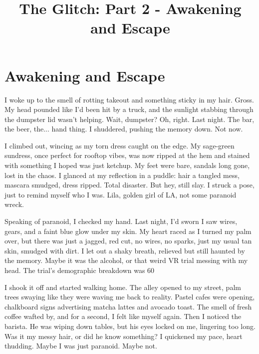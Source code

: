 \documentclass{article}
\title{The Glitch: Part 2 - Awakening and Escape}
\author{}
\date{}
\begin{document}
\maketitle

\section{Awakening and Escape}

I woke up to the smell of rotting takeout and something sticky in my hair. Gross. My head pounded like I'd been hit by a truck, and the sunlight stabbing through the dumpster lid wasn't helping. Wait, dumpster? Oh, right. Last night. The bar, the beer, the... hand thing. I shuddered, pushing the memory down. Not now.

I climbed out, wincing as my torn dress caught on the edge. My sage-green sundress, once perfect for rooftop vibes, was now ripped at the hem and stained with something I hoped was just ketchup. My feet were bare, sandals long gone, lost in the chaos. I glanced at my reflection in a puddle: hair a tangled mess, mascara smudged, dress ripped. Total disaster. But hey, still slay. I struck a pose, just to remind myself who I was. Lila, golden girl of LA, not some paranoid wreck.

Speaking of paranoid, I checked my hand. Last night, I'd sworn I saw wires, gears, and a faint blue glow under my skin. My heart raced as I turned my palm over, but there was just a jagged, red cut, no wires, no sparks, just my usual tan skin, smudged with dirt. I let out a shaky breath, relieved but still haunted by the memory. Maybe it was the alcohol, or that weird VR trial messing with my head. The trial's demographic breakdown was 60%

I shook it off and started walking home. The alley opened to my street, palm trees swaying like they were waving me back to reality. Pastel cafes were opening, chalkboard signs advertising matcha lattes and avocado toast. The smell of fresh coffee wafted by, and for a second, I felt like myself again. Then I noticed the barista. He was wiping down tables, but his eyes locked on me, lingering too long. Was it my messy hair, or did he know something? I quickened my pace, heart thudding. Maybe I was just paranoid. Maybe not.
\end{document}
